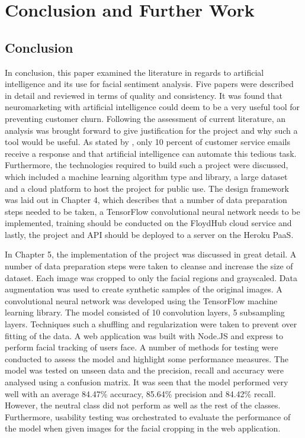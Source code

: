 \chapter{Conclusion and Further Work}

\section{Conclusion}
In conclusion, this paper examined the literature in regards to artificial intelligence and its use for facial sentiment analysis. Five papers were described in detail and reviewed in terms of quality and consistency. It was found that neuromarketing with artificial intelligence could deem to be a very useful tool for preventing customer churn. Following the assessment of current literature, an analysis was brought forward to give justification for the project and why such a tool would be useful. As stated by \citeauthor{willott}, only 10 percent of customer service emails receive a response and that artificial intelligence can automate this tedious task. Furthermore, the technologies required to build such a project were discussed, which included a machine learning algorithm type and library, a large dataset and a cloud platform to host the project for public use. The design framework was laid out in Chapter 4, which describes that a number of data preparation steps needed to be taken, a TensorFlow convolutional neural network needs to be implemented, training should be conducted on the FloydHub cloud service and lastly, the project and API should be deployed to a server on the Heroku PaaS. 

In Chapter 5, the implementation of the project was discussed in great detail. A number of data preparation steps were taken to cleanse and increase the size of dataset. Each image was cropped to only the facial regions and grayscaled. Data augmentation was used to create synthetic samples of the original images. A convolutional neural network was developed using the TensorFlow machine learning library. The model consisted of 10 convolution layers, 5 subsampling layers. Techniques such a shuffling and regularization were taken to prevent over fitting of the data. A web application was built with Node.JS and express to perform facial tracking of users face. 
A number of methods for testing were conducted to assess the model and highlight some performance measures. The model was tested on unseen data and the precision, recall and accuracy were analysed using a confusion matrix. It was seen that the model performed very well with an average 84.47\% accuracy, 85.64\% precision and 84.42\% recall. However, the neutral class did not perform as well as the rest of the classes. Furthermore, usability testing was orchestrated to evaluate the performance of the model when given images for the facial cropping in the web application. 

